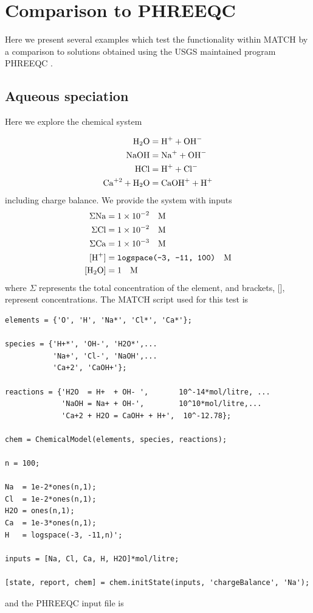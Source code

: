 \documentclass{article}
\begin{document}
\section{Comparison to PHREEQC}

Here we present several examples which test the functionality within MATCH by a comparison to solutions obtained using the USGS maintained program PHREEQC \cite{parkhurst1999}{}.

\subsection{Aqueous speciation}
Here we explore the chemical system

\begin{align}
    \ce{H2O} &= \ce{H+} + \ce{OH-}\\
    \ce{NaOH}&= \ce{Na+} + \ce{OH-}\\
    \ce{HCl} &= \ce{H+} + \ce{Cl-}\\
    \ce{Ca^{+2}} + \ce{H2O} &=\ce{CaOH+} + \ce{H+}
\end{align}
including charge balance. We provide the system with inputs
\begin{align}
\Sigma \ce{Na} &= 1\times10^{-2} \quad\text{M}\\
\Sigma \ce{Cl} &= 1\times10^{-2} \quad\text{M}\\
\Sigma \ce{Ca} &= 1\times10^{-3} \quad\text{M}\\
[\ce{H+}] &= \texttt{logspace(-3, -11, 100)} \quad\text{M}\\
[\ce{H2O}] & = 1 \quad\text{M}
\end{align}
where $\Sigma$ represents the total concentration of the element, and brackets, [], represent concentrations. The MATCH script used for this test is
\begin{lstlisting}
elements = {'O', 'H', 'Na*', 'Cl*', 'Ca*'};

species = {'H+*', 'OH-', 'H2O*',...
           'Na+', 'Cl-', 'NaOH',...
           'Ca+2', 'CaOH+'};

reactions = {'H2O  = H+  + OH- ',       10^-14*mol/litre, ...
             'NaOH = Na+ + OH-',        10^10*mol/litre,...
             'Ca+2 + H2O = CaOH+ + H+',  10^-12.78};

chem = ChemicalModel(elements, species, reactions);

n = 100;

Na  = 1e-2*ones(n,1);
Cl  = 1e-2*ones(n,1);
H2O = ones(n,1);
Ca  = 1e-3*ones(n,1);
H   = logspace(-3, -11,n)';

inputs = [Na, Cl, Ca, H, H2O]*mol/litre;

[state, report, chem] = chem.initState(inputs, 'chargeBalance', 'Na');
\end{lstlisting}
and the PHREEQC input file is
\end{document}
